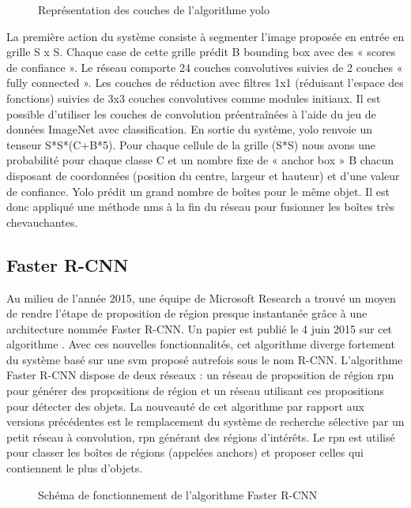 \documentclass[debug,nodate,hideweeklyreports]{polytech/polytech}
\begin{document}
\begin{figure}
  \caption{Représentation des couches de l'algorithme yolo}
  \label{fig:yololayers}
\end{figure}

La première action du système consiste à segmenter l’image proposée en entrée en grille S x S. Chaque case de cette grille prédit B bounding box avec des « scores de confiance ».
Le réseau comporte 24 couches convolutives suivies de 2 couches « fully connected ». Les couches de réduction avec filtres 1x1 (réduisant l’espace des fonctions) suivies de 3x3 couches convolutives comme modules initiaux. Il est possible d’utiliser les couches de convolution préentraînées à l'aide du jeu de données ImageNet avec classification.
En sortie du système, yolo renvoie un tenseur S*S*(C+B*5). Pour chaque cellule de la grille (S*S) nous avons une probabilité pour chaque classe C et un nombre fixe de « anchor box » B chacun disposant de coordonnées (position du centre, largeur et hauteur) et d’une valeur de confiance. 
Yolo prédit un grand nombre de boîtes pour le même objet. Il est donc appliqué une méthode \gls{nms} à la fin du réseau pour fusionner les boîtes très chevauchantes.

\subsection{Faster R-CNN}

Au milieu de l’année 2015, une équipe de Microsoft Research a trouvé un moyen de rendre l’étape de proposition de région presque instantanée grâce à une architecture nommée Faster R-CNN. Un papier est publié le 4 juin 2015 sur cet algorithme \cite{DBLP:journals/corr/RenHG015}. Avec ces nouvelles fonctionnalités, cet algorithme diverge fortement du système basé sur une \gls{svm} proposé autrefois sous le nom R-CNN.
L’algorithme Faster R-CNN dispose de deux réseaux : un réseau de proposition de région \gls{rpn} pour générer des propositions de région et un réseau utilisant ces propositions pour détecter des objets. La nouveauté de cet algorithme par rapport aux versions précédentes est le remplacement du système de recherche sélective par un petit réseau à convolution, \gls{rpn} générant des régions d’intérêts.
Le \gls{rpn} est utilisé pour classer les boîtes de régions (appelées anchors) et proposer celles qui contiennent le plus d’objets. 

\begin{figure}
  \caption{Schéma de fonctionnement de l'algorithme Faster R-CNN}
  \label{fig:fasterrcnn}
\end{figure}
\end{document}
